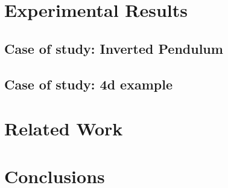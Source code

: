 \documentclass[sigconf]{acmart}
\begin{document}
\section{Experimental Results}

\subsection{Case of study: Inverted Pendulum}
%		

\subsection{Case of study: 4d example}
\section{Related Work}
\section{Conclusions}

\end{document}
